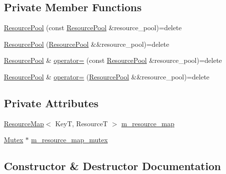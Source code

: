 \subsection*{Private Member Functions}
\begin{DoxyCompactItemize}
\item 
\hyperlink{classmage_1_1_resource_pool_a82253c9c4adfc120a813dfe811dd5e91}{Resource\+Pool} (const \hyperlink{classmage_1_1_resource_pool}{Resource\+Pool} \&resource\+\_\+pool)=delete
\item 
\hyperlink{classmage_1_1_resource_pool_a4ab8e492c60297ca2435aced3b95053a}{Resource\+Pool} (\hyperlink{classmage_1_1_resource_pool}{Resource\+Pool} \&\&resource\+\_\+pool)=delete
\item 
\hyperlink{classmage_1_1_resource_pool}{Resource\+Pool} \& \hyperlink{classmage_1_1_resource_pool_ae8121e031efe9f98605e478b01b19d33}{operator=} (const \hyperlink{classmage_1_1_resource_pool}{Resource\+Pool} \&resource\+\_\+pool)=delete
\item 
\hyperlink{classmage_1_1_resource_pool}{Resource\+Pool} \& \hyperlink{classmage_1_1_resource_pool_a1c0c196460508108435c227c11a65b94}{operator=} (\hyperlink{classmage_1_1_resource_pool}{Resource\+Pool} \&\&resource\+\_\+pool)=delete
\end{DoxyCompactItemize}
\subsection*{Private Attributes}
\begin{DoxyCompactItemize}
\item 
\hyperlink{namespacemage_a0b0a087ad59dd4aa0b4b538d8caec216}{Resource\+Map}$<$ KeyT, ResourceT $>$ \hyperlink{classmage_1_1_resource_pool_aecc46ecca2a54ef2816137276b1d73cd}{m\+\_\+resource\+\_\+map}
\item 
\hyperlink{classmage_1_1_mutex}{Mutex} $\ast$ \hyperlink{classmage_1_1_resource_pool_ad22becffd28fefa3c098c6bb40f52f41}{m\+\_\+resource\+\_\+map\+\_\+mutex}
\end{DoxyCompactItemize}


\subsection{Constructor \& Destructor Documentation}
\hypertarget{classmage_1_1_resource_pool_a590c1ebb30254714bedd7f821ff98241}{}\label{classmage_1_1_resource_pool_a590c1ebb30254714bedd7f821ff98241} 
